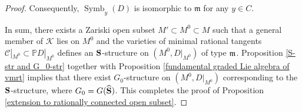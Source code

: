 \documentclass[12pt]{amsart}
\theoremstyle{plain}
\theoremstyle{definition}
\def\Symb{\operatorname{Symb}}
\begin{document}
\begin{proof}
Consequently, $\Symb_y(D)$ is isomorphic to $\mathfrak m$ for any $y \in C$.


In sum, there exists a Zariski open subset $M'\subset M^0\subset M$ such that a general member  of $\mathcal K$ lies on $M^0$ and the varieties of minimal rational tangents $\mathcal C|_{M^0}\subset \mathbb P D|_{M^0}$ defines an ${\bf S}$-structure on $(M^0, D|_{M^0})$ of type $\frak m$.
Proposition \ref{S-str and G_0-str} together with Proposition \ref{fundamental graded Lie algebra of vmrt} implies that
there exist $G_0$-structure on $(M^0, D|_{M^0})$ corresponding to the ${\bf S}$-structure, where $G_0=G(\widehat{\bf S})$. This completes the proof of Proposition  \ref{extension to rationally connected open subset}.
\end{proof}
\end{document}
